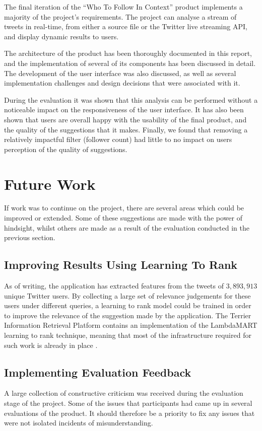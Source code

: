 \documentclass{l4proj}
\begin{document}
    The final iteration of the ``Who To Follow In Context'' product implements a majority of the project's requirements. The project can analyse a stream of tweets in real-time, from either a source file or the Twitter live streaming API, and display dynamic results to users.
    
     The architecture of the product has been thoroughly documented in this report, and the implementation of several of its components has been discussed in detail. The development of the user interface was also discussed, as well as several implementation challenges and design decisions that were associated with it.
    
     During the evaluation it was shown that this analysis can be performed without a noticeable impact on the responsiveness of the user interface. It has also been shown that users are overall happy with the usability of the final product, and the quality of the suggestions that it makes. Finally, we found that removing a relatively impactful filter (follower count) had little to no impact on users perception of the quality of suggestions.
    
    \section{Future Work}
    
    If work was to continue on the project, there are several areas which could be improved or extended. Some of these suggestions are made with the power of hindsight, whilst others are made as a result of the evaluation conducted in the previous section.
    
        \subsection{Improving Results Using Learning To Rank}
        As of writing, the application has extracted features from the tweets of $3,893,913$ unique Twitter users. By collecting a large set of relevance judgements for these users under different queries, a learning to rank model could be trained in order to improve the relevance of the suggestion made by the application. The Terrier Information Retrieval Platform contains an implementation of the LambdaMART learning to rank technique, meaning that most of the infrastructure required for such work is already in place \cite{l2r}.
        
        \subsection{Implementing Evaluation Feedback}
        A large collection of constructive criticism was received during the evaluation stage of the project. Some of the issues that participants had came up in several evaluations of the product. It should therefore be a priority to fix any issues that were not isolated incidents of misunderstanding.
        
\end{document}

